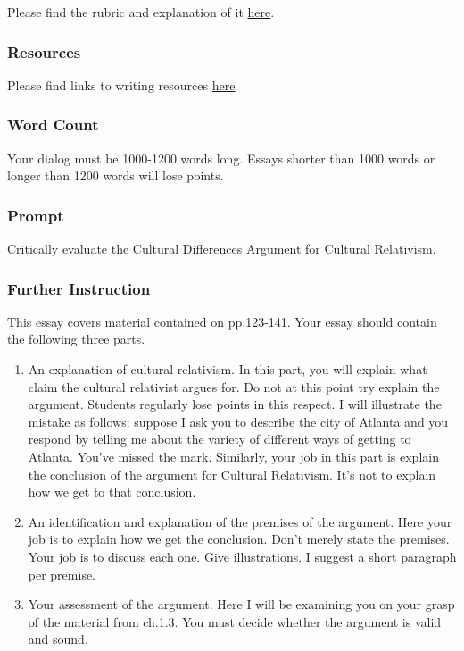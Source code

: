 \documentclass[]{article}
\begin{document}
Please find the rubric and explanation of it
\href{/Teaching/Grading/}{here}.

\subsubsection{Resources}\label{resources}

Please find links to writing resources \href{/Teaching/Resources/}{here}

\subsubsection{Word Count}\label{word-count}

Your dialog must be 1000-1200 words long. Essays shorter than 1000 words
or longer than 1200 words will lose points.

\subsubsection{Prompt}\label{prompt}

Critically evaluate the Cultural Differences Argument for Cultural
Relativism.

\subsubsection{Further Instruction}\label{further-instruction}

This essay covers material contained on pp.123-141. Your essay should
contain the following three parts.

\begin{enumerate}
\def\labelenumi{\arabic{enumi}.}
\itemsep1pt\parskip0pt
\item
  An explanation of cultural relativism. In this part, you will explain
  what claim the cultural relativist argues for. Do not at this point
  try explain the argument. Students regularly lose points in this
  respect. I will illustrate the mistake as follows: suppose I ask you
  to describe the city of Atlanta and you respond by telling me about
  the variety of different ways of getting to Atlanta. You've missed the
  mark. Similarly, your job in this part is explain the conclusion of
  the argument for Cultural Relativism. It's not to explain how we get
  to that conclusion.
\item
  An identification and explanation of the premises of the argument.
  Here your job is to explain how we get the conclusion. Don't merely
  state the premises. Your job is to discuss each one. Give
  illustrations. I suggest a short paragraph per premise.
\item
  Your assessment of the argument. Here I will be examining you on your
  grasp of the material from ch.1.3. You must decide whether the
  argument is valid and sound.
\end{enumerate}
\end{document}
